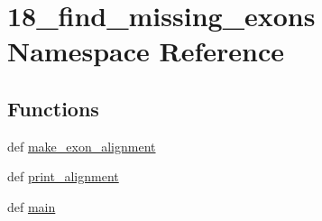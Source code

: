 \hypertarget{namespace18__find__missing__exons}{\section{18\-\_\-find\-\_\-missing\-\_\-exons Namespace Reference}
\label{namespace18__find__missing__exons}
}
\subsection*{Functions}
\begin{DoxyCompactItemize}
\item 
def \hyperlink{namespace18__find__missing__exons_a1a28c0a5ae454a2daba6ecf6c43972f7}{make\-\_\-exon\-\_\-alignment}
\item 
def \hyperlink{namespace18__find__missing__exons_a958e9c538d7e195a560d890f70f69003}{print\-\_\-alignment}
\item 
def \hyperlink{namespace18__find__missing__exons_a54f9377c72b0e6760b22c221b790a5a1}{main}
\end{DoxyCompactItemize}


